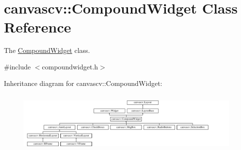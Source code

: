 \hypertarget{classcanvascv_1_1CompoundWidget}{}\section{canvascv\+:\+:Compound\+Widget Class Reference}
\label{classcanvascv_1_1CompoundWidget}


The \hyperlink{classcanvascv_1_1CompoundWidget}{Compound\+Widget} class.  




{\ttfamily \#include $<$compoundwidget.\+h$>$}

Inheritance diagram for canvascv\+:\+:Compound\+Widget\+:\begin{figure}[H]
\begin{center}
\leavevmode
\includegraphics[height=3.128491cm]{classcanvascv_1_1CompoundWidget}
\end{center}
\end{figure}
